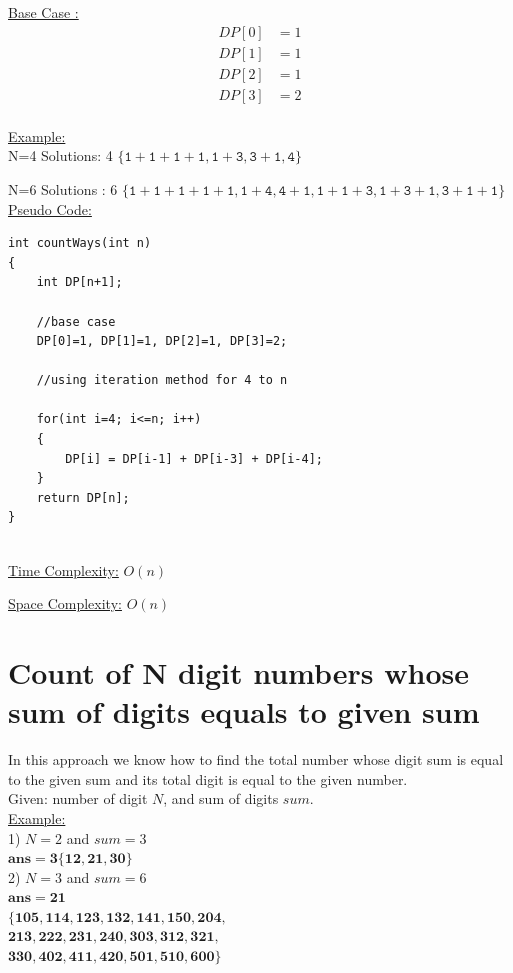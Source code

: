 \documentclass[12pt]{book}
\begin{document}
\underline{Base Case :}
\begin{align*}
DP[0] &= 1\\
DP[1] &= 1\\
DP[2] &= 1\\
DP[3] &= 2\\
\end{align*}
	
\underline{Example:}\\
	N=4\newline
	Solutions: 4 $\mathtt{\{ 1+1+1+1 , 1+3 , 3+1 , 4 \}}$\newline
	
	N=6\newline
	Solutions : 6 $\mathtt{\{ 1+1+1+1+1 , 1+4 , 4+1 , 1+1+3 , 1+3+1 , 3+1+1 \}}$\\

\underline{Pseudo Code:}\\
\begin{lstlisting}
int countWays(int n)
{
	int DP[n+1];
	
	//base case
	DP[0]=1, DP[1]=1, DP[2]=1, DP[3]=2;
	
	//using iteration method for 4 to n

	for(int i=4; i<=n; i++)
	{
		DP[i] = DP[i-1] + DP[i-3] + DP[i-4];
	}
	return DP[n];
}
\end{lstlisting}

\underline{\\Time Complexity:}  $O(n)$\newline

\underline{Space Complexity:}  $O(n)$\newline


\chapter{Count of N digit numbers whose sum of digits equals to given sum}
In this approach we know how to find the total number whose digit sum is equal to the given sum and its total digit is equal to the given number.\\
Given: number of digit $N$, and sum of digits $sum$.\\

\underline{Example:}\\

1) $N = 2$ and $sum = 3$\\
$\mathbf{ans = 3 \{12,21,30\}}$\\

	
2) $N = 3$ and $sum = 6$\\
$\mathbf{ans = 21}$\\
$\mathbf{\{105, 114, 123, 132, 141, 150, 204,}$\\
$\mathbf{213, 222, 231, 240, 303, 312, 321,}$\\
$\mathbf{ 330, 402, 411, 420, 501, 510, 600\}}$\\
\end{document}
